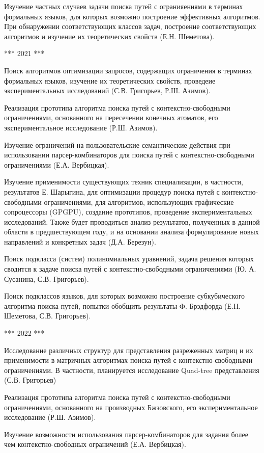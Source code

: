 \documentclass[12pt]{article}  %
\theoremstyle{remark}
\begin{document}
Изучение частных случаев задачи поиска путей с огранияениями в терминах формальных языков, для которых возможно построение эффективных алгоритмов. При обнаружении соответствующих классов задач, построение соответствующих алгоритмов и изучение их теоретических свойств (Е.Н. Шеметова).


*** 2021 ***

Поиск алгоритмов оптимизации запросов, содержащих ограничения в терминах формальных языков, изучение их теоретических свойств, проведеие экспериментальных исследований (С.В. Григорьев, Р.Ш. Азимов).

Реализация прототипа алгоритма поиска путей с контекстно-свободными ограничениями, основанного на пересечении конечных атоматов, его экспериментальное исследование (Р.Ш. Азимов).

Изучение ограничений на пользовательские семантические действия при использовании парсер-комбинаторов для поиска путей с контекстно-свободными ограничениями (Е.А. Вербицкая).

Изучение применимости существующих техник специализации, в частности, результатов Е. Шарыгина, для оптимизации процедур поиска путей с контекстно-свободными ограничениями, для алгоритмов, использующих графические сопроцессоры (GPGPU), создание прототипов, проведение экспериментальных исследований. Также будет проводиться анализ результатов, полученных в данной области в предшествующем году, и на основании анализа формулирование новых направлений и конкретных задач (Д.А. Березун).

Поиск подкласса (систем) полиномиальных уравнений, задача решения которых сводится к задаче поиска путей с контекстно-свободными ограничениями (Ю. А. Сусанина, С.В. Григорьев).

Поиск подклассов языков, для которых возможно построение субкубического алгоритма поиска путей, попытки обобщить результаты Ф. Брэдфорда (Е.Н. Шеметова, С.В. Григорьев).


*** 2022 ***

Исследование различных структур для представления разреженных матриц и их применимости в матричных алгоритмах поиска путей с контекстно-свободными ограничениями. В частности, планируется исследование Quad-tree представления (С.В. Григорьев)

Реализация прототипа алгоритма поиска путей с контекстно-свободными ограничениями, основанного на производных Бжзовского, его экспериментальное исследование (Р.Ш. Азимов).

Изучение возможности использования парсер-комбинаторов для задания более чем контекстно-свободных ограничений (Е.А. Вербицкая).
\end{document}
